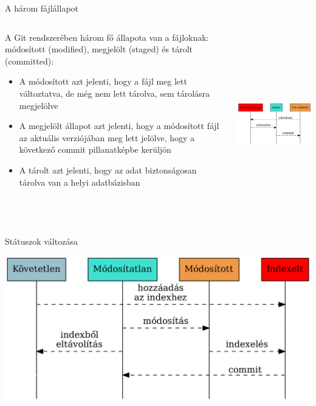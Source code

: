 \documentclass[english, aspectratio=169]{beamer}
\begin{document}
	\begin{frame}{A három fájlállapot}
		\begin{columns}
			\begin{column}{0.5\textwidth}
				A Git rendszerében három fő állapota van a fájloknak: módosított (modified), megjelölt (staged) és tárolt (committed):
				\begin{itemize}
					\item A módosított azt jelenti, hogy a fájl meg lett változtatva, de még nem lett tárolva, sem tárolásra megjelölve
					\item A megjelölt állapot azt jelenti, hogy a módosított fájl az aktuális verziójában meg lett jelölve, hogy a következő commit pillanatképbe kerüljön
					\item A tárolt azt jelenti, hogy az adat biztonságosan tárolva van a helyi adatbázisban
				\end{itemize}
			\end{column}
			\begin{column}{0.6\textwidth}
				\begin{center}
					\includegraphics[width=8cm, height=8cm, keepaspectratio]{graphs/git_5.png}
				\end{center}
			\end{column}
		\end{columns}
	\end{frame}
	
	\begin{frame}{Státuszok változása}
		\begin{center}
			\includegraphics[width=14cm, keepaspectratio]{graphs/git_6.png}
		\end{center}
	\end{frame}
	
\end{document}

